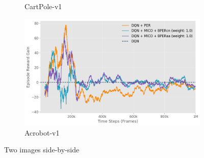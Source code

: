 \begin{figure}[h]
\begin{subfigure}{0.45\textwidth}
        \caption{CartPole-v1}
        \label{fig:uniform_weighting}
    \end{subfigure}
    \hfill
    \begin{subfigure}{0.45\textwidth}
        \includegraphics[width=\linewidth]{Results/general_results/acrobotv1_reward_gain_vs_dqn.png}
        \caption{Acrobot-v1}
        \label{fig:uniform_weighting}
    \end{subfigure}
    \caption{Two images side-by-side}
    \label{fig:outdated_priorities}
\end{figure}


